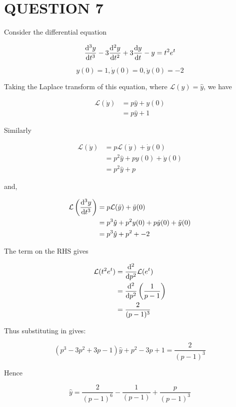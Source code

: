 \documentclass[a4paper]{article}
\begin{document}
\section{QUESTION 7}

Consider the differential equation


\[ \frac{\mathrm{d}^{3} y }{\mathrm{d} t^{3}} - 3 \frac{\mathrm{d}^{2} y }{\mathrm{d} t^{2}} + 3 \frac{\mathrm{d} y}{\mathrm{d} t} - y = t^{2} e^{t} \]

\[ y(0) = 1, \dot{y}(0) = 0, \ddot{y}(0) = -2 \]

Taking the Laplace transform of this equation, where $ \mathcal{L}(y) = \hat{y} $, we have

\begin{align*}
\mathcal{L}(\dot{y}) & = p \hat{y} + y(0) \\
& =  p \hat{y} + 1
\end{align*}

Similarly

\begin{align*}
\mathcal{L}(\ddot{y}) & = p \mathcal{L}(\dot{y}) + \dot{y}(0) \\
& = p^{2} \hat{y} + p y(0) + \dot{y}(0) \\
& = p^{2} \hat{y} + p
\end{align*}

and,

\begin{align*}
\mathcal{L} \left( \frac{\mathrm{d}^{3} y  }{\mathrm{d} t^{3}} \right) & = p \mathcal{L}(\ddot{y}) + \ddot{y}(0) \\
& = p^{3} \hat{y} + p^{2} y(0) + p \dot{y}(0) + \ddot{y}(0) \\
& = p^{3} \hat{y} + p^{2} + -2
\end{align*}

The term on the RHS gives

\begin{align*}
\mathcal{L}(t^{2}e^{t}) & = \frac{\mathrm{d}^{2} }{\mathrm{d} p^{2}} \mathcal{L}(e^{t}) \\
& =  \frac{\mathrm{d}^{2} }{\mathrm{d} p^{2}} \left(  \frac{1}{p - 1} \right) \\
& = \frac{2}{(p-1)^{3}} 
\end{align*}

Thus substituting in gives:

\[ (p^{3} - 3p^{2} + 3 p - 1 )\hat{y} + p^{2} - 3p + 1 = \frac{2}{(p-1)^{3}} \]

Hence

\[ \hat{y} = \frac{2}{(p-1)^{6}} - \frac{1}{(p-1)} + \frac{p}{(p-1)^{3}} \]
\end{document}
